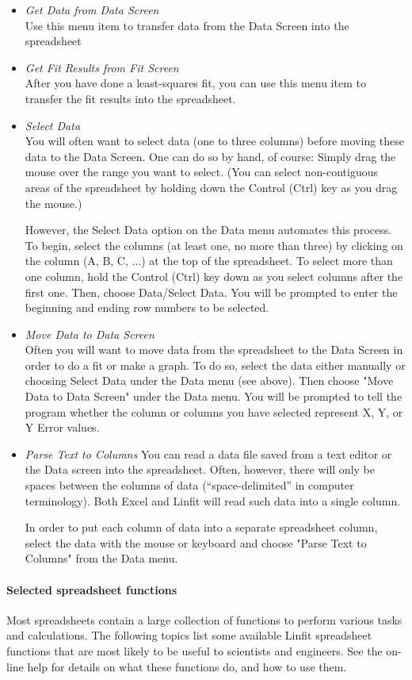 \begin{itemize}
\item {\em Get Data from Data Screen}\\
Use this menu item to transfer data from the Data Screen into the spreadsheet
%
\item {\em Get Fit Results from Fit Screen} \\
After you have done a least-squares fit, you can use this menu item to
transfer the fit results into the spreadsheet.
%
\item {\em Select Data} \\
You will often want to select data (one to three columns) before
moving these data to the Data Screen.  One can do so by hand, of
course: Simply drag the mouse over the range you want to select.  (You
can select non-contiguous areas of the spreadsheet by holding down the
Control (Ctrl) key as you drag the mouse.)

However, the Select Data option on the Data menu automates this
process.  To begin, select the columns (at least one, no more than
three) by clicking on the column (A, B, C, ...) at the top of the
spreadsheet.  To select more than one column, hold the Control (Ctrl)
key down as you select columns after the first one.  Then, choose
Data/Select Data.  You will be prompted to enter the beginning and
ending row numbers to be selected.
%
\item {\em Move Data to Data Screen} \\
Often you will want to move data from the spreadsheet to the Data
Screen in order to do a fit or make a graph.  To do so, select the
data either manually or choosing Select Data under the Data menu (see
above).  Then choose "Move Data to Data Screen" under the Data menu.
You will be prompted to tell the program whether the column or columns
you have selected represent X, Y, or Y Error values.
%
\item {\em Parse Text to Columns}
You can read a data file saved from a text editor or the Data screen
into the spreadsheet.  Often, however, there will only be spaces
between the columns of data (``space-delimited'' in computer terminology).
Both Excel and Linfit will read such data into a single column.

In order to put each column of data into a separate spreadsheet
column, select the data with the mouse or keyboard and choose "Parse
Text to Columns" from the Data menu.  \end{itemize}

\paragraph*{Selected spreadsheet functions}
Most spreadsheets contain a large collection of functions to perform
various tasks and calculations.  The following topics list some
available Linfit spreadsheet functions that are most likely to be
useful to scientists and engineers.  See the on-line help for details
on what these functions do, and how to use them.

